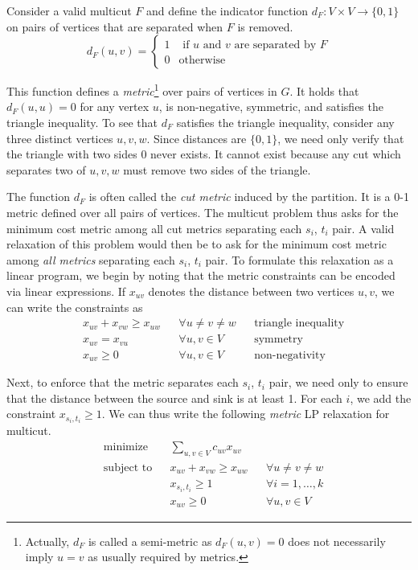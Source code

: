Consider a valid multicut $F$ and define the indicator function $d_{F}: V \times V \rightarrow \{ 0, 1 \}$ on pairs of vertices that are separated when $F$ is removed.
\begin{equation*}
d_F(u, v) = \begin{cases}
1 & \text{ if } u \text{ and } v \text{ are separated by } F \\
0 & \text{otherwise}
\end{cases}
\end{equation*}

This function defines a \emph{metric}\footnote{Actually, $d_F$ is called a semi-metric as $d_F(u, v) = 0$ does not necessarily imply $u = v$ as usually required by metrics.} over pairs of vertices in $G$. It holds that $d_F(u, u) = 0$ for any vertex $u$, is non-negative, symmetric, and satisfies the triangle inequality. To see that $d_F$ satisfies the triangle inequality, consider any three distinct vertices $u, v, w$. Since distances are $\{ 0, 1 \}$, we need only verify that the triangle with two sides 0 never exists. It cannot exist because any cut which separates two of $u, v, w$ must remove two sides of the triangle.

The function $d_F$ is often called the \emph{cut metric} induced by the partition. It is a 0-1 metric defined over all pairs of vertices. The multicut problem thus asks for the minimum cost metric among all cut metrics separating each $s_i$, $t_i$ pair. A valid relaxation of this problem would then be to ask for the minimum cost metric among \emph{all metrics} separating each $s_i$, $t_i$ pair. To formulate this relaxation as a linear program, we begin by noting that the metric constraints can be encoded via linear expressions. If $x_{uv}$ denotes the distance between two vertices $u, v$, we can write the constraints as
\begin{equation*}
\begin{aligned}
& x_{uv} + x_{vw} \geq x_{uw} & & \forall u \neq v \neq w & & \text{triangle inequality} \\
& x_{uv} = x_{vu} & & \forall u, v \in V & & \text{symmetry} \\
& x_{uv} \geq 0 & & \forall u, v \in V & & \text{non-negativity}
\end{aligned}
\end{equation*}

Next, to enforce that the metric separates each $s_i$, $t_i$ pair, we need only to ensure that the distance between the source and sink is at least 1. For each $i$, we add the constraint $x_{s_i, t_i} \geq 1$. We can thus write the following \emph{metric} LP relaxation for multicut.
\begin{equation}\label{eq:metric-lp}
\begin{aligned}
& \text{minimize}
& & \sum_{u, v \in V} c_{uv} x_{uv} & \\
& \text{subject to}
& & x_{uv} + x_{vw} \geq x_{uw} & & \forall u \neq v \neq w \\
& & & x_{s_i, t_i} \geq 1 & & \forall i = 1, \ldots, k \\
& & & x_{uv} \geq 0 & & \forall u, v \in V
\end{aligned}
\end{equation}

